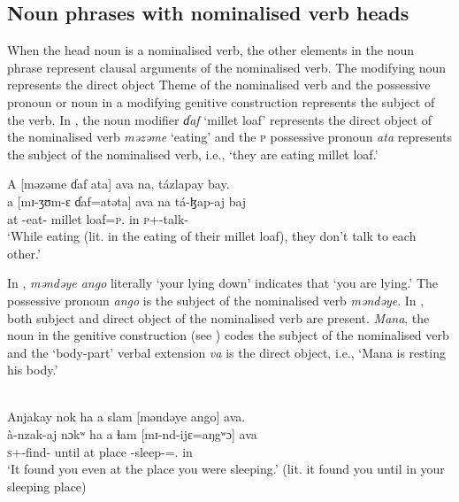 \subsection{Noun phrases with nominalised verb heads}\label{sec:5.2.1}
\hypertarget{RefHeading1211621525720847}{}
When the head noun is a nominalised verb, the other elements in the noun phrase represent clausal arguments of the nominalised verb. The modifying noun represents the direct object Theme of the nominalised verb and the possessive pronoun or noun in a modifying genitive construction represents the subject of the verb. In , the noun modifier \textit{ɗaf} ‘millet loaf’ represents the direct object of the nominalised verb \textit{məzəme} ‘eating’ and the \textsc{p} possessive pronoun \textit{ata} represents the subject of the nominalised verb, i.e., ‘they are eating millet loaf.’

\ea \label{ex:5:34}
A  [məzəme  ɗaf  ata]  ava  na,  tázlapay  bay.\\
\gll  a  [mɪ-ʒʊm-ɛ    ɗaf=atəta]    ava  na  tá-ɮap-aj  baj\\
      at  {\NOM}{}-eat-{\CL}    {millet loaf}=\textsc{p}.{\POSS}  in  {\PSP}  \textsc{p}+{\IFV}-talk-{\CL}  {\NEG}\\
\glt  ‘While eating (lit. in the eating of their millet loaf), they don’t talk to each other.’
\z

In , \textit{məndəye  ango} literally ‘your lying down’ indicates that ‘you are lying.’ The possessive pronoun \textit{ango} is the subject of the nominalised verb \textit{məndəye}. In , both subject and direct object of the nominalised verb are present. \textit{Mana}, the noun in the genitive construction (see ) codes the subject of the nominalised verb and the ‘body-part’ verbal extension \textit{va} is the direct object, i.e., ‘Mana is resting his body.’ 

\clearpage
\ea \label{ex:5:35}\\
Anjakay  nok ha  a  slam  [məndəye  ango]  ava.\\
\gll  à-nzak-aj        nɔkʷ ha   a   ɬam    [mɪ-nd-ijɛ=aŋgʷɔ]   ava\\
      \textsc{s}+{\PFV}-find{}-{\CL}  {\twoS}  until   at  place   {\NOM}{}-sleep{}-{\CL}={\twoS}.{\POSS}       in\\
\glt  ‘It found you even at the place you were sleeping.’ (lit. it found you until in your sleeping place)
\z

